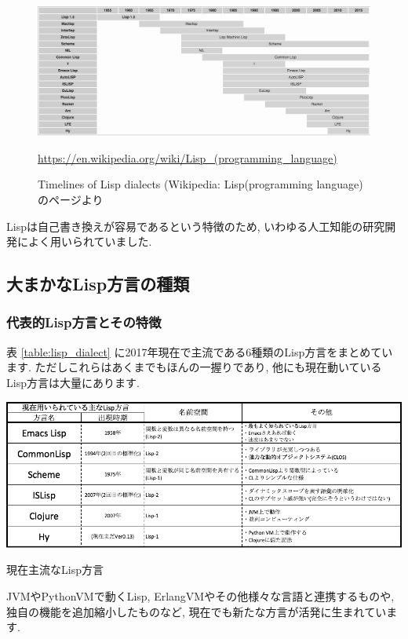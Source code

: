 \documentclass[mingoth,a4paper]{jsarticle}
\begin{document}
\pagebreak

\begin{figure}[htbp!]
\centering
\includegraphics[width=\linewidth]{image201709-kansai/time-lines-lisp-dialect_gray.png}
\caption{Timelines of Lisp dialects (Wikipedia: Lisp(programming language)のページより}
\url{https://en.wikipedia.org/wiki/Lisp_(programming_language)}
\end{figure}

Lispは自己書き換えが容易であるという特徴のため, いわゆる人工知能の研究開発によく用いられていました.

\subsection{大まかなLisp方言の種類}

\subsubsection{代表的Lisp方言とその特徴}
表 \ref{table:lisp_dialect} に2017年現在で主流である6種類のLisp方言をまとめています. ただしこれらはあくまでもほんの一握りであり, 他にも現在動いているLisp方言は大量にあります. 

\begin{table}[htbp!]
\centering
\includegraphics[width=\linewidth]{image201709-kansai/lisp-dial_gray.png}
\caption{現在主流なLisp方言}\label{table:lisp_dialect}
\end{table}

JVMやPythonVMで動くLisp, ErlangVMやその他様々な言語と連携するものや, 独自の機能を追加縮小したものなど, 現在でも新たな方言が活発に生まれています. 
\end{document}
